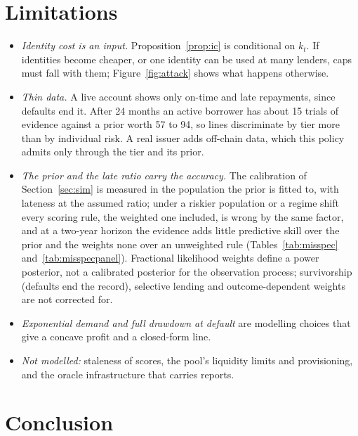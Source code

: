 \documentclass[preprint,11pt,authoryear]{elsarticle}
\begin{document}
\section{Limitations}

\begin{itemize}
\item \emph{Identity cost is an input.} Proposition~\ref{prop:ic} is conditional on $k_t$. If
  identities become cheaper, or one identity can be used at many lenders, caps must fall with them;
  Figure~\ref{fig:attack} shows what happens otherwise.
\item \emph{Thin data.} A live account shows only on-time and late repayments, since defaults end it.
  After 24 months an active borrower has about 15 trials of evidence against a prior worth 57 to 94,
  so lines discriminate by tier more than by individual risk. A real issuer adds off-chain data, which
  this policy admits only through the tier and its prior.
\item \emph{The prior and the late ratio carry the accuracy.} The calibration of Section~\ref{sec:sim}
  is measured in the population the prior is fitted to, with lateness at the assumed ratio; under a
  riskier population or a regime shift every scoring rule, the weighted one included, is wrong by
  the same factor, and at a two-year horizon the evidence adds little predictive skill over the
  prior and the weights none over an unweighted rule (Tables~\ref{tab:misspec}
  and~\ref{tab:misspecpanel}). Fractional likelihood weights define a power posterior, not a
  calibrated posterior for the observation process; survivorship (defaults end the record),
  selective lending and outcome-dependent weights are not corrected for.
\item \emph{Exponential demand and full drawdown at default} are modelling choices that give a concave
  profit and a closed-form line.
\item \emph{Not modelled:} staleness of scores, the pool's liquidity limits and provisioning, and the
  oracle infrastructure that carries reports.
\end{itemize}

\section{Conclusion}
\end{document}
